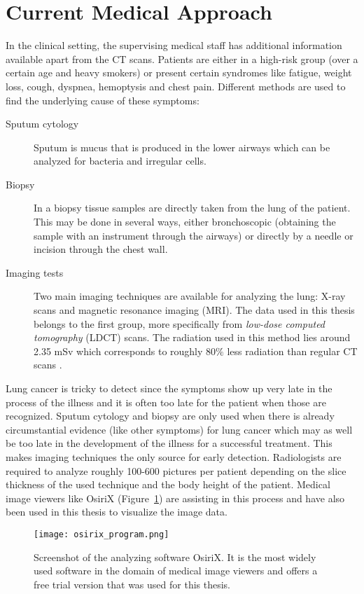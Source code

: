 \documentclass[main.tex]{subfiles}
\begin{document}
\section{Current Medical Approach}
In the clinical setting, the supervising medical staff has additional information available apart from the CT scans. Patients are either in a high-risk group (over a certain age and heavy smokers) or present certain syndromes like fatigue, weight loss, cough, dyspnea, hemoptysis and chest pain. Different methods are used to find the underlying cause of these symptoms:

\begin{description}
\item[Sputum cytology] Sputum is mucus that is produced in the lower airways which can be analyzed for bacteria and irregular cells.
\item[Biopsy] In a biopsy tissue samples are directly taken from the lung of the patient. This may be done in several ways, either bronchoscopic (obtaining the sample with an instrument through the airways) or directly by a needle or incision through the chest wall.
\item[Imaging tests] Two main imaging techniques are available for analyzing the lung: X-ray scans and magnetic resonance imaging (MRI). The data used in this thesis belongs to the first group, more specifically from \emph{low-dose computed tomography} (LDCT) scans. The radiation used in this method lies around 2.35 mSv which corresponds to roughly 80$\%$ less radiation than regular CT scans \cite{ono2013low}.
\end{description}

Lung cancer is tricky to detect since the symptoms show up very late in the process of the illness and it is often too late for the patient when those are recognized. Sputum cytology and biopsy are only used when there is already circumstantial evidence (like other symptoms) for lung cancer which may as well be too late in the development of the illness for a successful treatment. This makes imaging techniques the only source for early detection. Radiologists are required to analyze roughly 100-600 pictures per patient depending on the slice thickness of the used technique and the body height of the patient. Medical image viewers like OsiriX (Figure~\ref{fig:osirix}) are assisting in this process and have also been used in this thesis to visualize the image data.

\begin{figure}[ht]
\texttt{[image: osirix\_program.png]}
\caption{Screenshot of the analyzing software OsiriX. It is the most widely used software in the domain of medical image viewers and offers a free trial version that was used for this thesis.}
\label{fig:osirix}
\end{figure}
\end{document}
